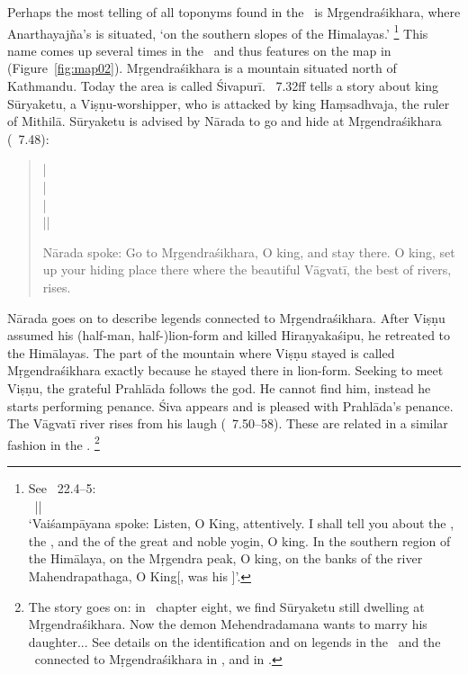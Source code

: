 Perhaps the most telling of all toponyms found
in the \VSS\ is Mṛgendra\-śikhara,\label{anarthayajnas_asrama} where Anarthayajña's  is situated,
`on the southern slopes of the Himalayas.'%
		\footnote{\label{mrgendrasikhara}See \VSS\ 22.4--5:\\
     		~||\\
			`Vaiśampāyana spoke: Listen, O King, attentively.
		  	I shall tell you about the , 
		  	the , and the  of the
		  	great and noble yogin, O king.
		  	In the southern region of the Himālaya, 
		  	on the Mṛgendra peak, O king,
		  	on the banks of the river Mahendrapathaga, O King[,
		  	was his ]'.}
This name comes up several times in the \NepMah\ and thus features on
the map in 
(Figure~\ref{fig:map02}). Mṛge\-ndra\-śikhara is a mountain
situated north of Kathmandu. Today the area is
called Śivapurī. \NepMah\ 7.32ff tells a story about king Sūryaketu, a Viṣṇu-worshipper,
who is attacked by king Haṃsadhvaja, the ruler of Mithilā. Sūryaketu is advised by Nārada
to go and hide at Mṛgendraśikhara (\NepMah\ 7.48):

\begin{quote}
 |\\
 |\\
 |\\
 ||

Nārada spoke:
Go to Mṛgendraśikhara, O king, and stay there.
O king, set up your hiding place there
where the beautiful Vāgvatī, the best of rivers, rises.
\end{quote}

\noindent
Nārada goes on to describe legends connected to Mṛgendraśikhara. 
After Viṣṇu assumed his (half-man, half-)lion-form and killed Hiraṇyakaśipu,
he retreated to the Himālayas. 
The part of the mountain where Viṣṇu stayed is called Mṛgendraśikhara exactly 
because he stayed there in lion-form.
Seeking to meet Viṣṇu, the grateful Prahlāda follows the god. 
He cannot find him, instead he starts performing penance.
Śiva appears and is pleased with Prahlāda's penance. 
The Vāgvatī river rises from his laugh (\NepMah\ 7.50--58).
These are related in a similar fashion in the
\Vagmati.%
         \footnote{The story goes on: 
        in \NepMah\ chapter eight, we find Sūryaketu still dwelling at Mṛgendraśikhara. 
        Now the demon Mehendradamana wants to marry his daughter...
        See details on the identification and
        on legends in the \NepMah\ and the \Vagmati\ connected to Mṛgendraśikhara in
        , and in
        .}

